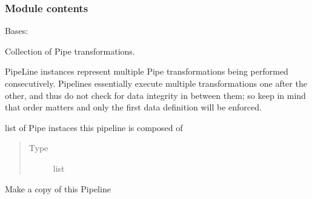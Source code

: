 \documentclass[letterpaper,10pt,english]{sphinxmanual}
\begin{document}
\subsubsection{Module contents}
\label{\detokenize{dalio.pipe:module-dalio.pipe}}\label{\detokenize{dalio.pipe:module-contents}}

\begin{fulllineitems}
\label{\detokenize{dalio.pipe:dalio.pipe.PipeLine}}
Bases: {\hyperref[\detokenize{dalio.pipe:dalio.pipe.pipe.Pipe}]{}}

Collection of Pipe transformations.

PipeLine instances represent multiple Pipe transformations being
performed consecutively. Pipelines essentially execute multiple
transformations one after the other, and thus do not check for data
integrity in between them; so keep in mind that order matters and only
the first data definition will be enforced.

\begin{fulllineitems}
\label{\detokenize{dalio.pipe:dalio.pipe.PipeLine.pipeline}}
list of Pipe instaces this pipeline is composed of
\begin{quote}\begin{description}
\item[{Type}] \leavevmode
list

\end{description}\end{quote}

\end{fulllineitems}


\begin{fulllineitems}
\label{\detokenize{dalio.pipe:dalio.pipe.PipeLine.copy}}
Make a copy of this Pipeline


\end{fulllineitems}
\end{fulllineitems}
\end{document}
